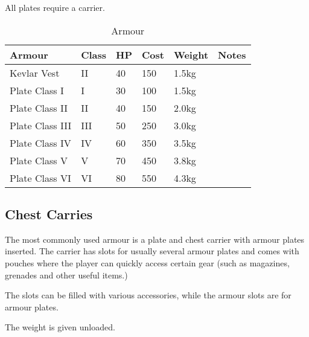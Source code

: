All plates require a carrier.

\begin{table}
  \caption{Armour}
  \label{tab:Armour}
  \begin{center}
    \begin{tabular}{| l | l | l | l | l | l |}

      \hline
      \textbf{Armour} & \textbf{Class} & \textbf{HP} &
      \textbf{Cost} & \textbf{Weight} & \textbf{Notes} \\ \hline

      Kevlar Vest     &  II & 40 & 150 & 1.5kg & \\ \hline
      Plate Class I   &   I & 30 & 100 & 1.5kg & \\ \hline
      Plate Class II  &  II & 40 & 150 & 2.0kg & \\ \hline
      Plate Class III & III & 50 & 250 & 3.0kg & \\ \hline
      Plate Class IV  &  IV & 60 & 350 & 3.5kg & \\ \hline
      Plate Class V   &   V & 70 & 450 & 3.8kg & \\ \hline
      Plate Class VI  &  VI & 80 & 550 & 4.3kg & \\ \hline

    \end{tabular}
  \end{center}
\end{table}

\subsection{Chest Carries}
\label{sub:9-Chest Carries}

The most commonly used armour is a plate and chest carrier with armour plates
inserted. The carrier has slots for usually several armour plates and comes
with pouches where the player can quickly access certain gear (such as
magazines, grenades and other useful items.)

The slots can be filled with various accessories, while the armour slots are
for armour plates.

The weight is given unloaded.

